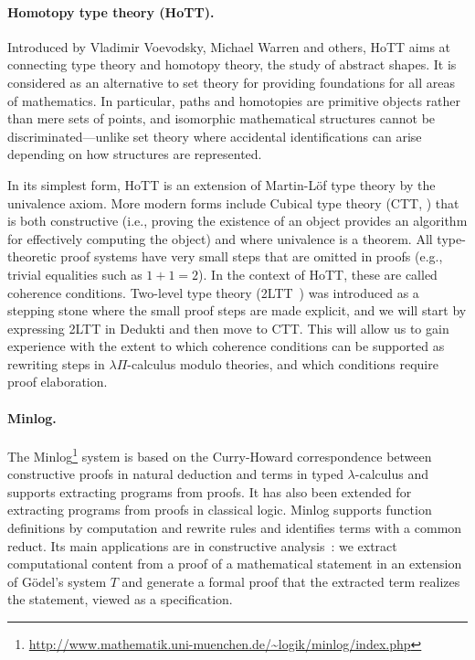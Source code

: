 \paragraph*{Homotopy type theory (HoTT).}

Introduced by Vladimir Voevodsky, Michael Warren and others, HoTT aims at
connecting type theory and homotopy theory, the study of abstract shapes. It is
considered as an alternative to set theory for providing foundations for all
areas of mathematics. In particular, paths and homotopies are primitive objects
rather than mere sets of points, and isomorphic mathematical structures cannot
be discriminated---unlike set theory where accidental identifications can arise
depending on how structures are represented.

In its simplest form, HoTT is an extension of Martin-L\"of type theory by the
univalence axiom. More modern forms include Cubical type theory (CTT,
\cite{cohen:cubical}) that is both constructive (i.e., proving the existence of
an object provides an algorithm for effectively computing the object) and where
univalence is a theorem. All type-theoretic proof systems have very small steps
that are omitted in proofs (e.g., trivial equalities such as $1+1=2$). In the
context of HoTT, these are called coherence conditions. Two-level type theory
(2LTT~\cite{annenkov:two-level}) was introduced as a stepping stone where the
small proof steps are made explicit, and we will start by expressing 2LTT in
Dedukti and then move to CTT. This will allow us to gain experience with
the extent to which coherence conditions can be supported as rewriting steps in
$\lambda\Pi$-calculus modulo theories, and which conditions require proof
elaboration.

\paragraph*{Minlog.}

The
Minlog\footnote{\url{http://www.mathematik.uni-muenchen.de/~logik/minlog/index.php}}
system is based on the Curry-Howard correspondence between constructive proofs
in natural deduction and terms in typed $\lambda$-calculus and supports
extracting programs from proofs. It has also been extended for extracting
programs from proofs in classical logic. Minlog supports function definitions by
computation and rewrite rules and identifies terms with a common reduct. Its
main applications are in constructive analysis~\cite{miyamoto:real}: we extract
computational content from a proof of a mathematical statement in an extension
of Gödel's system $T$ and generate a formal proof that the extracted term
realizes the statement, viewed as a specification.

